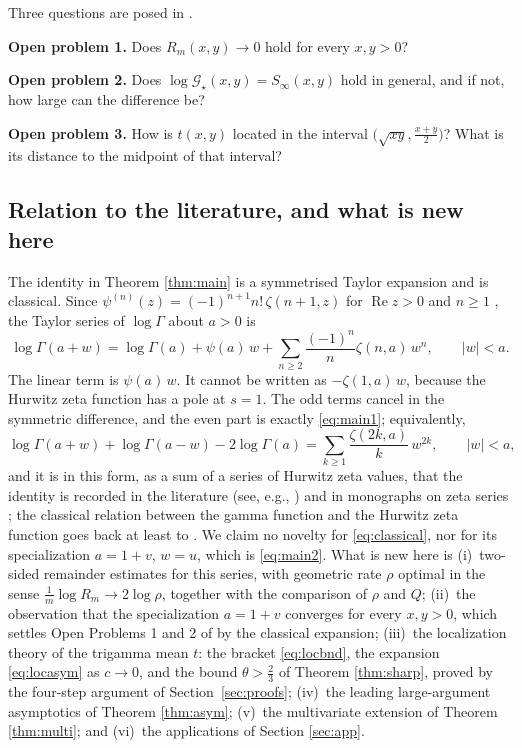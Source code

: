 \documentclass[11pt,a4paper]{amsart}
\theoremstyle{definition}
\newcommand{\Gs}{\mathcal{G}_{\star}}
\begin{document}
Three questions are posed in \cite[\S2]{Wisniewska25}.

\smallskip
\noindent\textbf{Open problem 1.} Does $R_{m}(x,y)\to0$ hold for every $x,y>0$?

\noindent\textbf{Open problem 2.} Does $\log\Gs(x,y)=S_{\infty}(x,y)$ hold in general, and
if not, how large can the difference be?

\noindent\textbf{Open problem 3.} How is $t(x,y)$ located in the interval
$\big(\sqrt{xy},\tfrac{x+y}{2}\big)$? What is its distance to the midpoint of that interval?
\normalsize

\subsection{Relation to the literature, and what is new here}
The identity in Theorem \ref{thm:main} is a symmetrised Taylor expansion and is
classical. Since $\psi^{(n)}(z)=(-1)^{n+1}n!\,\zeta(n+1,z)$ for
$\operatorname{Re}z>0$ and $n\ge1$ \cite[\S5.15]{DLMF}, the Taylor series of $\log\Gamma$
about $a>0$ is
\begin{equation}\label{eq:taylorlog}
  \log\Gamma(a+w)=\log\Gamma(a)+\psi(a)\,w
  +\sum_{n\ge2}\frac{(-1)^{n}}{n}\zeta(n,a)\,w^{n},
  \qquad |w|<a .
\end{equation}
The linear term is $\psi(a)\,w$. It cannot be written as $-\zeta(1,a)\,w$, because the
Hurwitz zeta function has a pole at $s=1$. The odd terms cancel in the symmetric
difference, and the even part is exactly \eqref{eq:main1}; equivalently,
\begin{equation}\label{eq:classical}
  \log\Gamma(a+w)+\log\Gamma(a-w)-2\log\Gamma(a)
   =\sum_{k\ge1}\frac{\zeta(2k,a)}{k}\,w^{2k},\qquad |w|<a ,
\end{equation}
and it is in this form, as a sum of a series of Hurwitz zeta values, that the identity is
recorded in the literature (see, e.g., \cite{Srivastava88}) and in monographs on zeta
series \cite{SrivastavaChoi01}; the classical relation between the gamma function and the
Hurwitz zeta function goes back at least to \cite{Berndt85}. We claim no novelty
for \eqref{eq:classical}, nor for its specialization $a=1+v$, $w=u$, which is
\eqref{eq:main2}. What is new here is
(i)~two-sided remainder estimates for this series, with geometric rate $\rho$ optimal in
the sense $\frac1m\log R_m\to2\log\rho$, together with the comparison of $\rho$ and $Q$;
(ii)~the observation that the specialization $a=1+v$ converges for every $x,y>0$, which
settles Open Problems 1 and 2 of \cite{Wisniewska25} by the classical expansion;
(iii)~the localization theory of the trigamma mean $t$: the bracket \eqref{eq:locbnd},
the expansion \eqref{eq:locasym} as $c\to0$, and the bound $\theta>\frac23$ of
Theorem \ref{thm:sharp}, proved by the four-step argument of Section~\ref{sec:proofs};
(iv)~the leading large-argument asymptotics of Theorem \ref{thm:asym};
(v)~the multivariate extension of Theorem \ref{thm:multi}; and
(vi)~the applications of Section \ref{sec:app}.
\end{document}
